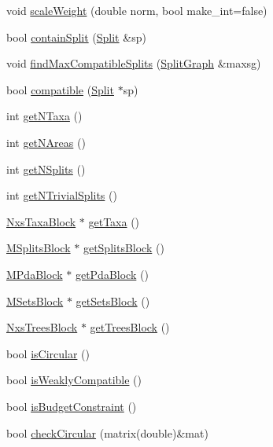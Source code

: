 \begin{DoxyCompactItemize}
\item 
void \hyperlink{classSplitGraph_aaa150a66ac97d6170336a9c74ffecc88}{scaleWeight} (double norm, bool make\_\-int=false)
\item 
bool \hyperlink{classSplitGraph_a43b37646702074556d3c7c894dbee9ca}{containSplit} (\hyperlink{classSplit}{Split} \&sp)
\item 
void \hyperlink{classSplitGraph_a870e02f7034993ce445ab9ae1964a781}{findMaxCompatibleSplits} (\hyperlink{classSplitGraph}{SplitGraph} \&maxsg)
\item 
bool \hyperlink{classSplitGraph_acaa3948107ecf6717cd11cd57829587e}{compatible} (\hyperlink{classSplit}{Split} $\ast$sp)
\item 
int \hyperlink{classSplitGraph_a779ae52f511731d598f6133ecb0deb51}{getNTaxa} ()
\item 
int \hyperlink{classSplitGraph_adfdcee57a677ea807d595328abb28481}{getNAreas} ()
\item 
int \hyperlink{classSplitGraph_a848a5f43fcb791dd99a1865d5fe9df46}{getNSplits} ()
\item 
int \hyperlink{classSplitGraph_a4e3c9a6363de8ac9d1bd15797306aaf1}{getNTrivialSplits} ()
\item 
\hyperlink{classNxsTaxaBlock}{NxsTaxaBlock} $\ast$ \hyperlink{classSplitGraph_a3f0181782d3b80190ea24a8eeb44b289}{getTaxa} ()
\item 
\hyperlink{classMSplitsBlock}{MSplitsBlock} $\ast$ \hyperlink{classSplitGraph_a4a4029deff1beb7089b3559790da4b2d}{getSplitsBlock} ()
\item 
\hyperlink{classMPdaBlock}{MPdaBlock} $\ast$ \hyperlink{classSplitGraph_a6eb74cff199a65a2e3b3a17c7a7c96e9}{getPdaBlock} ()
\item 
\hyperlink{classMSetsBlock}{MSetsBlock} $\ast$ \hyperlink{classSplitGraph_acafe07757402de0ed22320bcc2429f55}{getSetsBlock} ()
\item 
\hyperlink{classNxsTreesBlock}{NxsTreesBlock} $\ast$ \hyperlink{classSplitGraph_ad10d2632515ccf7b795cb9ace660e050}{getTreesBlock} ()
\item 
bool \hyperlink{classSplitGraph_ae7b98f722c61033d05cee4b1e2c68e54}{isCircular} ()
\item 
bool \hyperlink{classSplitGraph_a05cfb8141526a6cbc5905eb74dccc0fa}{isWeaklyCompatible} ()
\item 
bool \hyperlink{classSplitGraph_a93a2b7ec12a3f75f143a2dfada8d7a02}{isBudgetConstraint} ()
\item 
bool \hyperlink{classSplitGraph_aab13a9043727eb04c7afa61ddf489b8f}{checkCircular} (matrix(double)\&mat)

\end{DoxyCompactItemize}
